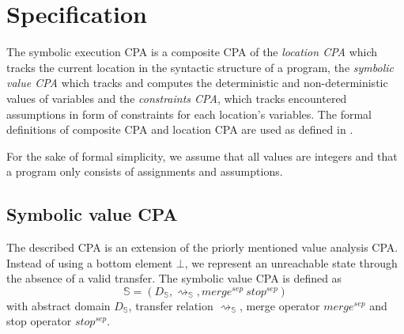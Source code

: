\newcommand{\symex}{\mathbb{S}}

\newcommand{\constraints}{\mathbb{C}}
\newcommand{\location}{\mathbb{L}}
\newcommand{\composition}{\mathcal{C}}

\newcommand{\transfer}{\rightsquigarrow}
\newcommand{\gtransfer}{\overset{g}{\transfer}}
\newcommand{\strengthen}{\downarrow}

\newcommand{\valueset}{\mathscr{Z}}
\newcommand{\integerset}{\mathbb{Z}}

\newcommand{\symlattice}{\mathscr{E}}
\newcommand{\symidset}{S_I}
\newcommand{\symexpset}{S_E}

\newcommand{\constraintlattice}{\mathscr{C}}

\newcommand{\llbracket}{[\![}
\newcommand{\rrbracket}{]\!]}
\newcommand{\concretization}{\llbracket \cdot \rrbracket}
\newcommand{\lesserEqual}{\sqsubseteq}
\newcommand{\leastupperbound}{\sqcup}

\newcommand{\satisfies}{\vDash}

\section{Specification}
The symbolic execution CPA is a composite CPA of the \emph{location CPA} which tracks the current location in the syntactic structure of a program, the \emph{symbolic value CPA} which tracks and computes the deterministic and non-deterministic values of variables and the \emph{constraints CPA}, which tracks encountered assumptions in form of constraints for each location's variables. The formal definitions of composite CPA and location CPA are used as defined in \cite{Beyer2007}.

For the sake of formal simplicity, we assume that all values are integers and that a program only consists of assignments and assumptions.

\subsection{Symbolic value CPA}
The described CPA is an extension of the priorly mentioned value analysis CPA.
Instead of using a bottom element $\bot$, we represent an unreachable state through the absence of a valid transfer.
The symbolic value CPA is defined as
\[\symex = (D_\symex, \transfer_\symex, merge^{sep}\ stop^{sep})\]
with abstract domain $D_\symex$, transfer relation $\transfer_\symex$, merge operator $merge^{sep}$ and stop operator $stop^{sep}$.

